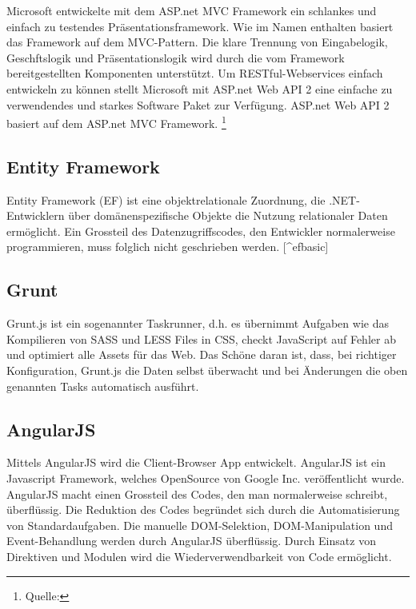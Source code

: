 Microsoft entwickelte mit dem ASP.net MVC Framework ein schlankes und
einfach zu testendes Präsentationsframework. Wie im Namen enthalten
basiert das Framework auf dem MVC-Pattern. Die klare Trennung von
Eingabelogik, Geschftslogik und Präsentationslogik wird durch die vom
Framework bereitgestellten Komponenten unterstützt. Um
RESTful-Webservices einfach entwickeln zu können stellt Microsoft mit
ASP.net Web API 2 eine einfache zu verwendendes und starkes Software
Paket zur Verfügung. ASP.net Web API 2 basiert auf dem ASP.net MVC
Framework. \footnote{Quelle:\autocite{csharpbasic}}

\newpage

\subsection{Entity Framework}\label{entity-framework-1}

Entity Framework (EF) ist eine objektrelationale Zuordnung, die
.NET-Entwicklern über domänenspezifische Objekte die Nutzung
relationaler Daten ermöglicht. Ein Grossteil des Datenzugriffscodes, den
Entwickler normalerweise programmieren, muss folglich nicht geschrieben
werden. {[}\^{}efbasic{]}

\subsection{Grunt}\label{grunt}

Grunt.js ist ein sogenannter Taskrunner, d.h. es übernimmt Aufgaben wie
das Kompilieren von SASS und LESS Files in CSS, checkt JavaScript auf
Fehler ab und optimiert alle Assets für das Web. Das Schöne daran ist,
dass, bei richtiger Konfiguration, Grunt.js die Daten selbst überwacht
und bei Änderungen die oben genannten Tasks automatisch ausführt.

\subsection{AngularJS}\label{angularjs}

Mittels AngularJS wird die Client-Browser App entwickelt. AngularJS ist
ein Javascript Framework, welches OpenSource von Google Inc.
veröffentlicht wurde. AngularJS macht einen Grossteil des Codes, den man
normalerweise schreibt, überflüssig. Die Reduktion des Codes begründet
sich durch die Automatisierung von Standardaufgaben. Die manuelle
DOM-Selektion, DOM-Manipulation und Event-Behandlung werden durch
AngularJS überflüssig. Durch Einsatz von Direktiven und Modulen wird die
Wiederverwendbarkeit von Code ermöglicht.

